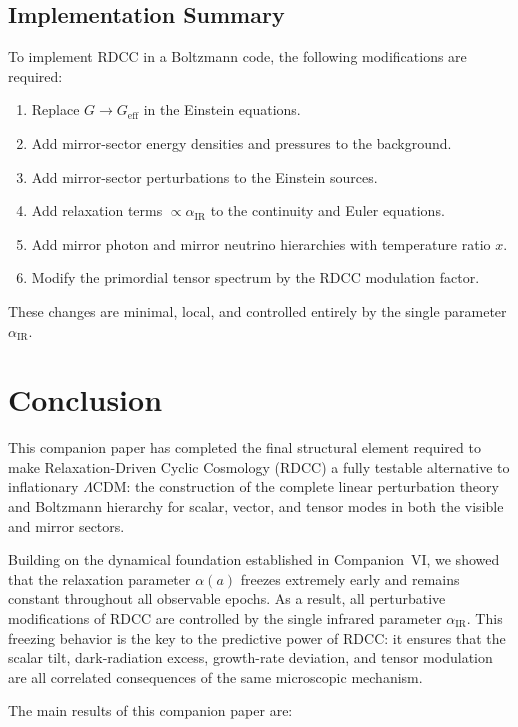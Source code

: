 \documentclass[11pt,a4paper]{article}
\begin{document}
\subsection{Implementation Summary}

To implement RDCC in a Boltzmann code, the following modifications are required:

\begin{enumerate}
    \item Replace $G \rightarrow G_{\mathrm{eff}}$ in the Einstein equations.
    \item Add mirror-sector energy densities and pressures to the background.
    \item Add mirror-sector perturbations to the Einstein sources.
    \item Add relaxation terms $\propto \alpha_{\mathrm{IR}}$ to the continuity and Euler equations.
    \item Add mirror photon and mirror neutrino hierarchies with temperature ratio $x$.
    \item Modify the primordial tensor spectrum by the RDCC modulation factor.
\end{enumerate}

These changes are minimal, local, and controlled entirely by the single parameter
$\alpha_{\mathrm{IR}}$.

\section{Conclusion}

This companion paper has completed the final structural element required to make
Relaxation-Driven Cyclic Cosmology (RDCC) a fully testable alternative to inflationary
$\Lambda$CDM: the construction of the complete linear perturbation theory and Boltzmann
hierarchy for scalar, vector, and tensor modes in both the visible and mirror sectors.

Building on the dynamical foundation established in Companion~VI, we showed that the
relaxation parameter $\alpha(a)$ freezes extremely early and remains constant throughout all
observable epochs. As a result, all perturbative modifications of RDCC are controlled by the
single infrared parameter $\alpha_{\mathrm{IR}}$. This freezing behavior is the key to the predictive
power of RDCC: it ensures that the scalar tilt, dark-radiation excess, growth-rate deviation,
and tensor modulation are all correlated consequences of the same microscopic mechanism.

The main results of this companion paper are:
\end{document}

